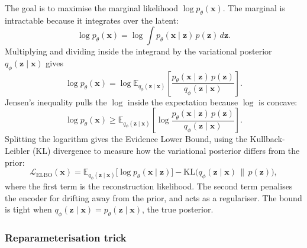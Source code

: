 \documentclass{article}
\begin{document}
The goal is to maximise the marginal likelihood $\log p_\theta(\mathbf{x})$. The marginal is intractable because it integrates over the latent:
\begin{equation}
\log p_\theta(\mathbf{x}) = \log \int p_\theta(\mathbf{x} \mid \mathbf{z}) \, p(\mathbf{z}) \, d\mathbf{z}.
\label{eq:marginal}
\end{equation}
Multiplying and dividing inside the integrand by the variational posterior $q_\phi(\mathbf{z} \mid \mathbf{x})$ gives
\begin{equation}
\log p_\theta(\mathbf{x}) = \log \mathbb{E}_{q_\phi(\mathbf{z} \mid \mathbf{x})} \!\left[\frac{p_\theta(\mathbf{x} \mid \mathbf{z}) \, p(\mathbf{z})}{q_\phi(\mathbf{z} \mid \mathbf{x})}\right].
\label{eq:iw}
\end{equation}
Jensen's inequality pulls the $\log$ inside the expectation because $\log$ is concave:
\begin{equation}
\log p_\theta(\mathbf{x}) \geq \mathbb{E}_{q_\phi(\mathbf{z} \mid \mathbf{x})}\!\left[\log \frac{p_\theta(\mathbf{x} \mid \mathbf{z}) \, p(\mathbf{z})}{q_\phi(\mathbf{z} \mid \mathbf{x})}\right].
\label{eq:jensen}
\end{equation}
Splitting the logarithm gives the Evidence Lower Bound, using the Kullback-Leibler (KL) divergence to measure how the variational posterior differs from the prior:
\begin{equation}
\mathcal{L}_\text{ELBO}(\mathbf{x}) = \mathbb{E}_{q_\phi(\mathbf{z} \mid \mathbf{x})}\!\bigl[\log p_\theta(\mathbf{x} \mid \mathbf{z})\bigr] - \mathrm{KL}\!\bigl(q_\phi(\mathbf{z} \mid \mathbf{x}) \,\|\, p(\mathbf{z})\bigr),
\label{eq:elbo}
\end{equation}
where the first term is the reconstruction likelihood. The second term penalises the encoder for drifting away from the prior, and acts as a regulariser. The bound is tight when $q_\phi(\mathbf{z} \mid \mathbf{x}) = p_\theta(\mathbf{z} \mid \mathbf{x})$, the true posterior.

\subsubsection*{Reparameterisation trick}
\end{document}
